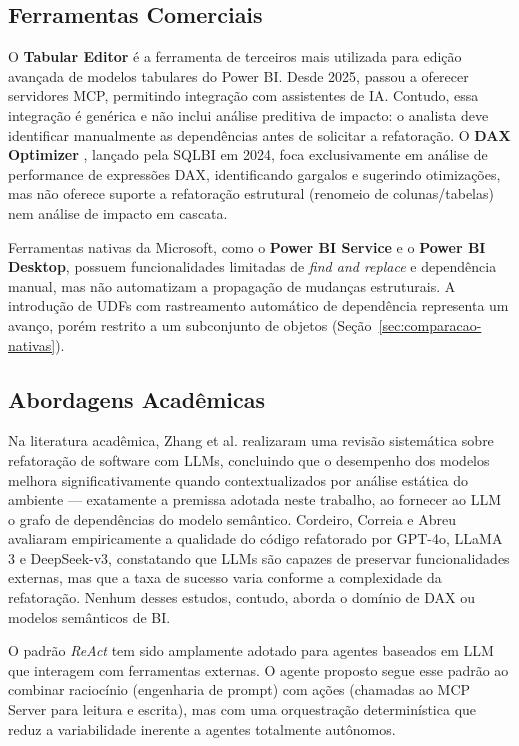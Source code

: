 \documentclass[
    12pt,               %
    openright,          %
    oneside,            %
    a4paper,            %
    chapter=TITLE,      %
    section=TITLE,      %
    brazil              %
]{abntex2}
\begin{document}
\subsection{Ferramentas Comerciais}

O \textbf{Tabular Editor} \cite{tabulareditor2025mcp} é a ferramenta de terceiros mais utilizada para edição avançada de modelos tabulares do Power BI. Desde 2025, passou a oferecer servidores MCP, permitindo integração com assistentes de IA. Contudo, essa integração é genérica e não inclui análise preditiva de impacto: o analista deve identificar manualmente as dependências antes de solicitar a refatoração. O \textbf{DAX Optimizer} \cite{sqlbi2024optimizer}, lançado pela SQLBI em 2024, foca exclusivamente em análise de performance de expressões DAX, identificando gargalos e sugerindo otimizações, mas não oferece suporte a refatoração estrutural (renomeio de colunas/tabelas) nem análise de impacto em cascata.

Ferramentas nativas da Microsoft, como o \textbf{Power BI Service} e o \textbf{Power BI Desktop}, possuem funcionalidades limitadas de \textit{find and replace} e dependência manual, mas não automatizam a propagação de mudanças estruturais. A introdução de UDFs com rastreamento automático de dependência \cite{microsoft2026daxudf} representa um avanço, porém restrito a um subconjunto de objetos (Seção~\ref{sec:comparacao-nativas}).

\subsection{Abordagens Acadêmicas}

Na literatura acadêmica, Zhang et al. \cite{zhang2024staticllm} realizaram uma revisão sistemática sobre refatoração de software com LLMs, concluindo que o desempenho dos modelos melhora significativamente quando contextualizados por análise estática do ambiente — exatamente a premissa adotada neste trabalho, ao fornecer ao LLM o grafo de dependências do modelo semântico. Cordeiro, Correia e Abreu \cite{cordeiro2024llmrefactor} avaliaram empiricamente a qualidade do código refatorado por GPT-4o, LLaMA 3 e DeepSeek-v3, constatando que LLMs são capazes de preservar funcionalidades externas, mas que a taxa de sucesso varia conforme a complexidade da refatoração. Nenhum desses estudos, contudo, aborda o domínio de DAX ou modelos semânticos de BI.

O padrão \textit{ReAct} \cite{yao2023react} tem sido amplamente adotado para agentes baseados em LLM que interagem com ferramentas externas. O agente proposto segue esse padrão ao combinar raciocínio (engenharia de prompt) com ações (chamadas ao MCP Server para leitura e escrita), mas com uma orquestração determinística que reduz a variabilidade inerente a agentes totalmente autônomos.
\end{document}
